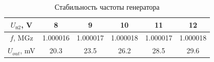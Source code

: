 \documentclass[a4paper]{article}
\begin{document}
\begin{enumerate}
    \begin{table}[H]
        \centering
        \begin{center}
        \end{center}
        \vspace{0.1cm}
        \begin{tabular}{|c|c|c|c|c|c|}
            \hline
            $U_{п2}$, V & 8&9&10&11&12 \\ 
            \hline
            $f$, MGz  &1.000016&  1.000017& 1.000018& 1.000017& 1.000018 \\ 
            \hline
            $U_{out}$, mV &20.3&23.5&26.2 &28.5&29.6 \\
            \hline
            \end{tabular}
            \caption{Стабильность частоты генератора}
            \label{t5}
    \end{table}


\end{enumerate}
\end{document}
